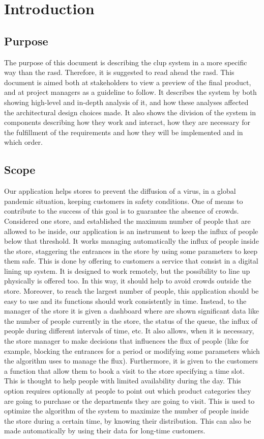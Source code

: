 \chapter{Introduction}


\section{Purpose}
The purpose of this document is describing the \gls{clup} system in a more specific way than the \gls{rasd}.
Therefore, it is suggested to read ahead the \gls{rasd}. This document is aimed both at stakeholders to view a preview of the final product, and at project managers as a guideline to follow.
It describes the system by both showing high-level and in-depth analysis of it, and how these analyses affected the architectural design choices made. It also shows the division of the system in components describing how they work and interact, how they are necessary for the fulfillment of the requirements and how they will be implemented and in which order.


\section{Scope}
Our application helps stores to prevent the diffusion of a virus, in a global pandemic situation, keeping customers in safety conditions.
One of means to contribute to the success of this goal is to guarantee the absence of crowds.
Considered one store, and established the maximum number of people that are allowed to be inside, our application is an instrument to keep the influx of people below that threshold.
It works managing automatically the influx of people inside the store, staggering the entrances in the store by using some parameters to keep them safe.
This is done by offering to customers a service that consist in a digital lining up system. It is designed to work remotely, but the possibility to line up physically is offered too. In this way, it should help to avoid crowds outside the store.
Moreover, to reach the largest number of people, this application should be easy to use and its functions should work consistently in time.
Instead, to the manager of the store it is given a dashboard where are shown significant data like the number of people currently in the store, the status of the queue, the influx of people during different intervals of time, etc. It also allows, when it is necessary, the store manager to make decisions that influences the flux of people (like for example, blocking the entrances for a period or modifying some parameters which the algorithm uses to manage the flux).
Furthermore, it is given to the customers a function that allow them to book a visit to the store specifying a time slot. This is thought to help people with limited availability during the day.
This option requires optionally at people to point out which product categories they are going to purchase or the departments they are going to visit. This is used to optimize the algorithm of the system to maximize the number of people inside the store during a certain time, by knowing their distribution. This can also be made automatically by using their data for long-time customers.


